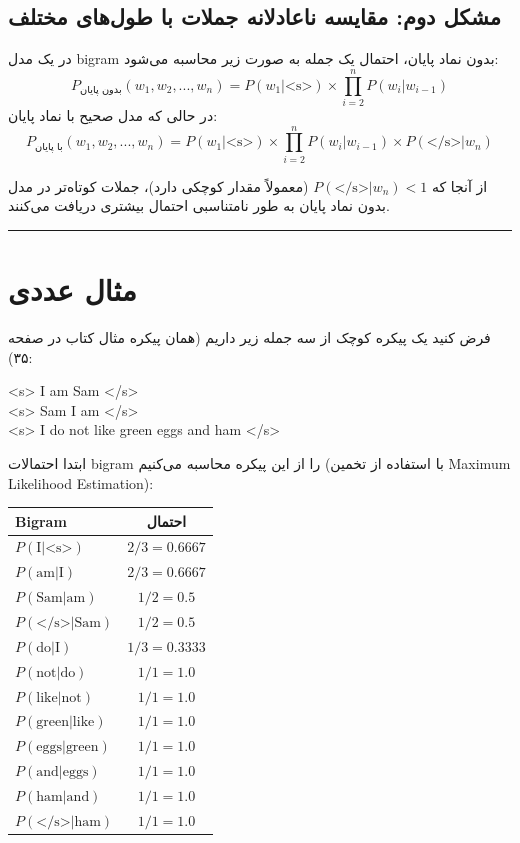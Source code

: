 \documentclass[11pt,a4paper]{article}
\newcommand{\en}[1]{\textenglish{#1}}
\newcommand{\separator}{\vspace{1em}\noindent\rule{\linewidth}{0.4pt}\vspace{1em}}
\begin{document}
\subsection*{مشکل دوم: مقایسه ناعادلانه جملات با طول‌های مختلف}
در یک مدل \en{bigram} بدون نماد پایان، احتمال یک جمله به صورت زیر محاسبه می‌شود:
\[
P_{\text{بدون پایان}}(w_1, w_2, ..., w_n) = P(w_1|\text{<s>}) \times \prod_{i=2}^{n} P(w_i|w_{i-1})
\]
در حالی که مدل صحیح با نماد پایان:
\[
P_{\text{با پایان}}(w_1, w_2, ..., w_n) = P(w_1|\text{<s>}) \times \prod_{i=2}^{n} P(w_i|w_{i-1}) \times P(\text{</s>}|w_n)
\]

از آنجا که $P(\text{</s>}|w_n) < 1$ (معمولاً مقدار کوچکی دارد)، جملات کوتاه‌تر در مدل بدون نماد پایان به طور نامتناسبی احتمال بیشتری دریافت می‌کنند.

\separator
\section{مثال عددی}
فرض کنید یک پیکره کوچک از سه جمله زیر داریم (همان پیکره مثال کتاب در صفحه ۳۵):

\begin{center}
\en{<s> I am Sam </s>} \\
\en{<s> Sam I am </s>} \\
\en{<s> I do not like green eggs and ham </s>}
\end{center}

ابتدا احتمالات \en{bigram} را از این پیکره محاسبه می‌کنیم (با استفاده از تخمین \en{Maximum Likelihood Estimation}):

\begin{center}
\begin{tabular}{|l|c|}
\hline
\textbf{\en{Bigram}} & \textbf{احتمال} \\
\hline
$P(\text{I}|\text{<s>})$ & $2/3 = 0.6667$ \\
\hline
$P(\text{am}|\text{I})$ & $2/3 = 0.6667$ \\
\hline
$P(\text{Sam}|\text{am})$ & $1/2 = 0.5$ \\
\hline
$P(\text{</s>}|\text{Sam})$ & $1/2 = 0.5$ \\
\hline
$P(\text{do}|\text{I})$ & $1/3 = 0.3333$ \\
\hline
$P(\text{not}|\text{do})$ & $1/1 = 1.0$ \\
\hline
$P(\text{like}|\text{not})$ & $1/1 = 1.0$ \\
\hline
$P(\text{green}|\text{like})$ & $1/1 = 1.0$ \\
\hline
$P(\text{eggs}|\text{green})$ & $1/1 = 1.0$ \\
\hline
$P(\text{and}|\text{eggs})$ & $1/1 = 1.0$ \\
\hline
$P(\text{ham}|\text{and})$ & $1/1 = 1.0$ \\
\hline
$P(\text{</s>}|\text{ham})$ & $1/1 = 1.0$ \\
\hline
\end{tabular}
\end{center}
\newpage
\end{document}
